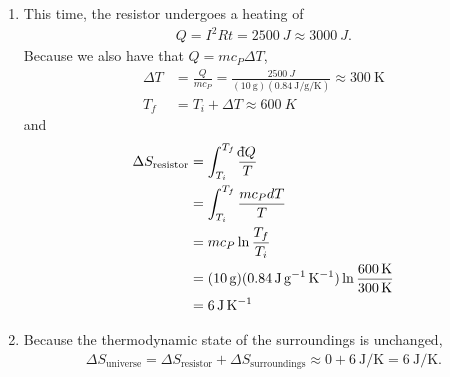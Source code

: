 \documentclass[a4paper,12pt]{article}
\def\dbar{{\mathchar'26\mkern-12mu \mathrm{d}}}
\begin{document}
\begin{enumerate}[label=\textbf{[\arabic*]}]
\begin{enumerate}
            \item
                This time, the resistor undergoes a heating of
                \begin{align*}
                    Q = I^2 Rt = \SI{2500}{J} \approx \SI{3000}{J}.
                \end{align*}
                Because we also have that $Q = m c_P \Delta T$,
                \begin{align*}
                    \Delta T &= \frac{Q}{mc_P} = \frac{\SI{2500}{J}}{(\SI{10}{\g}) (\SI{0.84}{\J\per\g\per\K})} \approx \SI{300}{\K} \\
                    T_f &= T_i + \Delta T \approx \SI{600}{K}
                \end{align*}
                and
                \begin{align*}
                    \Delta S_{\text{resistor}} &= \int_{T_i}^{T_f} \frac{\dbar Q}{T} \\
                    &= \int_{T_i}^{T_f} \frac{m c_P dT}{T} \\
                    &= m c_P \ln\frac{T_f}{T_i} \\
                    &= (\SI{10}{\g}) (\SI{0.84}{\J\per\g\per\K}) \ln\frac{\SI{600}{K}}{\SI{300}{K}} \\
                    &= \SI{6}{\J\per\K}
                \end{align*}
 
            \item
                Because the thermodynamic state of the surroundings is unchanged,
                \begin{align*}
                    \Delta S_{\text{universe}} = \Delta S_{\text{resistor}} + \Delta S_{\text{surroundings}} \approx 0 + \SI{6}{\J\per\K} = \SI{6}{\J\per\K}.
                \end{align*}
        \end{enumerate}


\end{enumerate}
\end{document}
